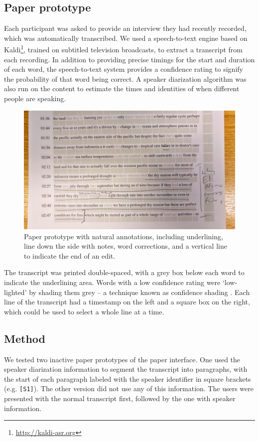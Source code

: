 \subsection{Paper prototype}
Each participant was asked to provide an interview they had recently recorded, which was automatically transcribed.  We
used a speech-to-text engine based on Kaldi\footnote{\url{http://kaldi-asr.org}}, trained on subtitled television
broadcasts, to extract a transcript from each recording. In addition to providing precise timings for the start and
duration of each word, the speech-to-text system provides a confidence rating to signify the probability of that word
being correct. A speaker diarization \citep{AngueraMiro2012} algorithm was also run on the content to estimate the
times and identities of when different people are speaking.

\begin{figure}[h]
  \centering
  \includegraphics[width=\columnwidth]{figs/mockup}
  \caption{Paper prototype with natural annotations, including
    underlining, line down the side with notes, word corrections, and a
    vertical line to indicate the end of an edit.}
  \label{fig:natural}
\end{figure}

The transcript was printed double-spaced, with a grey box below each word to indicate the underlining area.  Words with
a low confidence rating were `low-lighted' by shading them grey -- a technique known as confidence
shading \citep{Vemuri2004}.  Each line of the transcript had a timestamp on the left and a square box on the right, which
could be used to select a whole line at a time.

\subsection{Method}
We tested two inactive paper prototypes of the paper interface.  One used the speaker diarization information to
segment the transcript into paragraphs, with the start of each paragraph labeled with the speaker identifier in square
brackets (e.g.  \texttt{{[}S1{]}}). The other version did not use any of this information. The users were presented
with the normal transcript first, followed by the one with speaker information.

